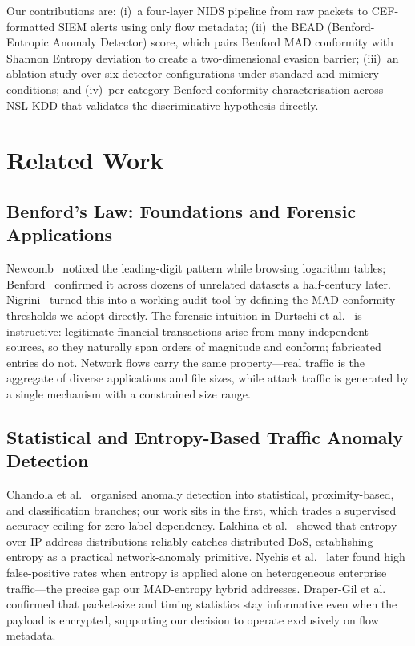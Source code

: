 \documentclass[conference]{IEEEtran}
\begin{document}
Our contributions are: (i)~a four-layer NIDS pipeline from raw packets to
CEF-formatted SIEM alerts using only flow metadata; (ii)~the BEAD
(Benford-Entropic Anomaly Detector) score, which pairs Benford MAD
conformity with Shannon Entropy deviation to create a two-dimensional
evasion barrier; (iii)~an ablation study over six detector
configurations under standard and mimicry conditions; and
(iv)~per-category Benford conformity characterisation across NSL-KDD that
validates the discriminative hypothesis directly.

\section{Related Work}

\subsection{Benford's Law: Foundations and Forensic Applications}

Newcomb~\cite{b4} noticed the leading-digit pattern while browsing
logarithm tables; Benford~\cite{b5} confirmed it across dozens of
unrelated datasets a half-century later. Nigrini~\cite{b6} turned this
into a working audit tool by defining the MAD conformity thresholds we
adopt directly. The forensic intuition in Durtschi et al.~\cite{b12} is
instructive: legitimate financial transactions arise from many independent
sources, so they naturally span orders of magnitude and conform; fabricated
entries do not. Network flows carry the same property—real traffic is
the aggregate of diverse applications and file sizes, while attack traffic
is generated by a single mechanism with a constrained size range.

\subsection{Statistical and Entropy-Based Traffic Anomaly Detection}

Chandola et al.~\cite{b7} organised anomaly detection into statistical,
proximity-based, and classification branches; our work sits in the first,
which trades a supervised accuracy ceiling for zero label dependency.
Lakhina et al.~\cite{b8} showed that entropy over IP-address distributions
reliably catches distributed DoS, establishing entropy as a practical
network-anomaly primitive. Nychis et al.~\cite{b11} later found high
false-positive rates when entropy is applied alone on heterogeneous
enterprise traffic—the precise gap our MAD-entropy hybrid addresses.
Draper-Gil et al.~\cite{b10} confirmed that packet-size and timing
statistics stay informative even when the payload is encrypted, supporting
our decision to operate exclusively on flow metadata.
\end{document}
